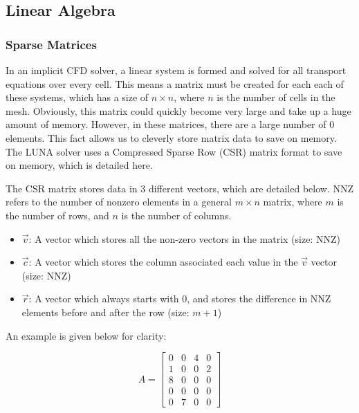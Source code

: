 \subsection{Linear Algebra}




\FloatBarrier
\subsubsection{Sparse Matrices}

In an implicit CFD solver, a linear system is formed and solved for all transport equations over every cell. This means a matrix must be created for each each of these systems, which has a size of $n \times n$, where $n$ is the number of cells in the mesh. Obviously, this matrix could quickly become very large and take up a huge amount of memory. However, in these matrices, there are a large number of 0 elements. This fact allows us to cleverly store matrix data to save on memory. The LUNA solver uses a Compressed Sparse Row (CSR) matrix format to save on memory, which is detailed here. 

The CSR matrix stores data in 3 different vectors, which are detailed below. NNZ refers to the number of nonzero elements in a general $m \times n$ matrix, where $m$ is the number of rows, and $n$ is the number of columns.

\begin{itemize}
\item $\vec{v}$: A vector which stores all the non-zero vectors in the matrix (size: NNZ)
\item $\vec{c}$: A vector which stores the column associated each value in the $\vec{v}$ vector (size: NNZ)
\item $\vec{r}$: A vector which always starts with 0, and stores the difference in NNZ elements before and after the row (size: $m+1$)
\end{itemize}

An example is given below for clarity:

\begin{equation}
A = \begin{bmatrix}
0 & 0 & 4 & 0 \\
1 & 0 & 0 & 2 \\
8 & 0 & 0 & 0 \\
0 & 0 & 0 & 0 \\
0 & 7 & 0 & 0
\end{bmatrix}
\end{equation}

